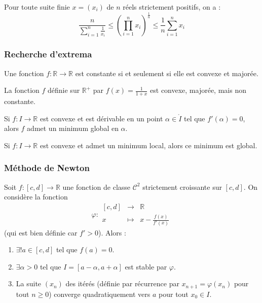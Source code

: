 	\begin{proposition}
		Pour toute suite finie $x = (x_i)$ de $n$ réels strictement positifs, on a :
		\[ \frac{n}{\sum_{i=1}^n \frac{1}{x_i}} \leq \left( \prod_{i=1}^n x_i \right)^{\frac{1}{n}} \leq \frac{1}{n} \sum_{i=1}^n x_i \]
	\end{proposition}

	\subsubsection{Recherche d'extrema}


	\begin{proposition}
		Une fonction $f : \mathbb{R} \rightarrow \mathbb{R}$ est constante si et seulement si elle est convexe et majorée.
	\end{proposition}

	\begin{cexample}
		La fonction $f$ définie sur $\mathbb{R}^+$ par $f(x) = \frac{1}{1+x}$ est convexe, majorée, mais non constante.
	\end{cexample}

	\begin{proposition}
		Si $f : I \rightarrow \mathbb{R}$ est convexe et est dérivable en un point $\alpha \in \mathring{I}$ tel que $f'(\alpha) = 0$, alors $f$ admet un minimum global en $\alpha$.
	\end{proposition}

	\begin{proposition}
		Si $f : I \rightarrow \mathbb{R}$ est convexe et admet un minimum local, alors ce minimum est global.
	\end{proposition}

	\subsubsection{Méthode de Newton}


	\begin{theorem}
		Soit $f : [c, d] \rightarrow \mathbb{R}$ une fonction de classe $\mathcal{C}^2$ strictement croissante sur $[c, d]$. On considère la fonction
		\[ \varphi :
		\begin{array}{ccc}
			[c, d] &\rightarrow& \mathbb{R} \\
			x &\mapsto& x - \frac{f(x)}{f'(x)}
		\end{array}
		\]
		(qui est bien définie car $f' > 0$). Alors :
		\begin{enumerate}[label=(\roman*)]
			\item $\exists! a \in [c, d]$ tel que $f(a) = 0$.
			\item $\exists \alpha > 0$ tel que $I = [a - \alpha, a + \alpha]$ est stable par $\varphi$.
			\item La suite $(x_n)$ des itérés (définie par récurrence par $x_{n+1} = \varphi(x_n)$ pour tout $n \geq 0$) converge quadratiquement vers $a$ pour tout $x_0 \in I$.
		\end{enumerate}
	\end{theorem}

